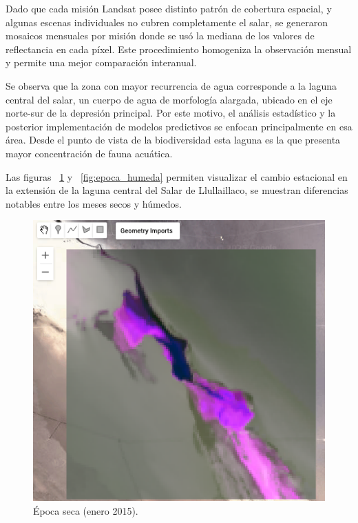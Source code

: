 Dado que cada misión Landsat posee distinto patrón de cobertura espacial, y algunas escenas individuales no cubren completamente el salar, se generaron mosaicos mensuales por misión donde se usó la mediana de los valores de reflectancia en cada píxel. Este procedimiento homogeniza la observación mensual y permite una mejor comparación interanual.


Se observa que la zona con mayor recurrencia de agua corresponde a la laguna central del salar, un cuerpo de agua de morfología alargada, ubicado en el eje norte-sur de la depresión principal. Por este motivo, el análisis estadístico y la posterior implementación de modelos predictivos se enfocan principalmente en esa área. Desde el punto de vista de la biodiversidad esta laguna es la que presenta mayor concentración de fauna acuática.

Las figuras ~\ref{fig:epoca_seca} y ~\ref{fig:epoca_humeda} permiten visualizar el cambio estacional en la extensión de la laguna central del Salar de Llullaillaco, se muestran diferencias notables entre los meses secos y húmedos.


\begin{figure}[ht]
        \centering
        \includegraphics[scale=.37]
        {Figures/fig8_seco.png}
        \caption{Época seca (enero 2015).}
        \label{fig:epoca_seca}
\end{figure}

